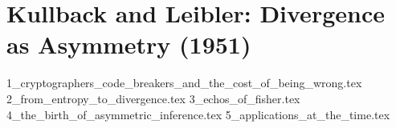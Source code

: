 \section{Kullback and Leibler: Divergence as Asymmetry (1951)}


{1_cryptographers_code_breakers_and_the_cost_of_being_wrong.tex}
{2_from_entropy_to_divergence.tex}
{3_echos_of_fisher.tex}
{4_the_birth_of_asymmetric_inference.tex}
{5_applications_at_the_time.tex}


